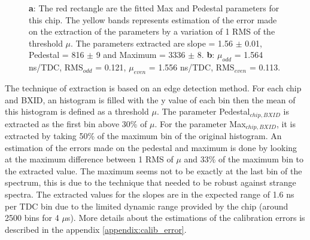 \documentclass[twoside,a4paper,11pt]{article}
\begin{document}
\begin{figure}[htbp]
	\hfill
	\caption[]{\textbf{a}: The red rectangle are the fitted Max and Pedestal parameters for this chip. The yellow bands represents estimation of the error made on the extraction of the parameters by a variation of 1 RMS of the threshold $\mu$. The parameters extracted are slope = 1.56 $\pm$ 0.01, Pedestal = 816 $\pm$ 9 and Maximum = 3336 $\pm$ 8. \textbf{b}: $\mu_{odd}$ = 1.564 ns/TDC, RMS$_{odd}$ = 0.121, $\mu_{even}$ = 1.556 ns/TDC, RMS$_{even}$ = 0.113.}
\end{figure}
The technique of extraction is based on an edge detection method. For each chip and BXID, an histogram is filled with the y value of each bin then the mean of this histogram is defined as a threshold $\mu$. The parameter Pedestal$_{chip, BXID}$ is extracted as the first bin above 30\% of $\mu$. For the parameter Max$_{chip, BXID}$, it is extracted by taking 50\% of the maximum bin of the original histogram. An estimation of the errors made on the pedestal and maximum is done by looking at the maximum difference between 1 RMS of $\mu$ and 33\% of the maximum bin to the extracted value. The maximum seems not to be exactly at the last bin of the spectrum, this is due to the technique that needed to be robust against strange spectra.
The extracted values for the slopes are in the expected range of 1.6 ns per TDC bin due to the limited dynamic range provided by the chip (around 2500 bins for 4 $\mu$s). More details about the estimations of the calibration errors is described in the appendix \ref{appendix:calib_error}.
\end{document}
